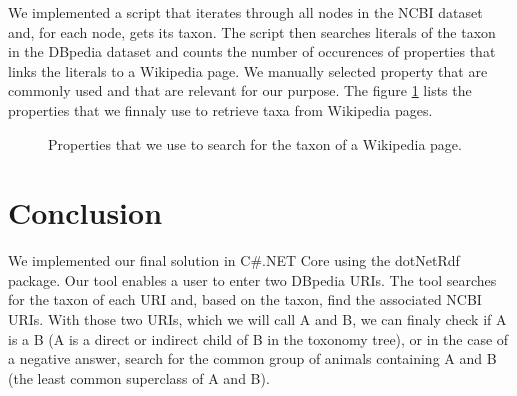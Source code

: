 \documentclass{article}
\begin{document}
We implemented a script that iterates through all nodes in the NCBI dataset and, for each node, gets its taxon. The script then searches literals of the taxon in the DBpedia dataset and counts the number of occurences of properties that links the literals to a Wikipedia page. We manually selected property that are commonly used and that are relevant for our purpose. The figure \ref{lst:taxon_properties} lists the properties that we finnaly use to retrieve taxa from Wikipedia pages.

\begin{figure}[h]

\caption{Properties that we use to search for the taxon of a Wikipedia page.}
\label{lst:taxon_properties}
\end{figure}

\section{Conclusion}

We implemented our final solution in C\#.NET Core using the dotNetRdf package. Our tool enables a user to enter two DBpedia URIs. The tool searches for the taxon of each URI and, based on the taxon, find the associated NCBI URIs. With those two URIs, which we will call A and B, we can finaly check if A is a B (A is a direct or indirect child of B in the toxonomy tree), or in the case of a negative answer, search for the common group of animals containing A and B (the least common superclass of A and B).

\end{document}
